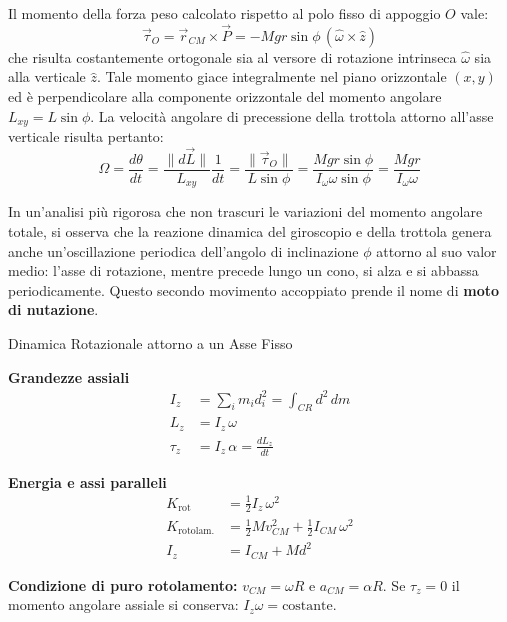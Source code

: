 Il momento della forza peso calcolato rispetto al polo fisso di appoggio $O$ vale:
\begin{equation}
    \vec{\tau}_O = \vec{r}_{CM} \times \vec{P} = -Mgr \sin\phi \, (\hat{\omega} \times \hat{z})
\end{equation}
che risulta costantemente ortogonale sia al versore di rotazione intrinseca $\hat{\omega}$ sia alla verticale $\hat{z}$. Tale momento giace integralmente nel piano orizzontale $(x,y)$ ed è perpendicolare alla componente orizzontale del momento angolare $L_{xy} = L \sin\phi$.
La velocità angolare di precessione della trottola attorno all'asse verticale risulta pertanto:
\begin{equation}
    \Omega = \frac{d\theta}{dt} = \frac{\|d\vec{L}\|}{L_{xy}} \frac{1}{dt} = \frac{\|\vec{\tau}_O\|}{L \sin\phi} = \frac{Mgr \sin\phi}{I_\omega \omega \sin\phi} = \frac{Mgr}{I_\omega \omega}
\end{equation}

In un'analisi più rigorosa che non trascuri le variazioni del momento angolare totale, si osserva che la reazione dinamica del giroscopio e della trottola genera anche un'oscillazione periodica dell'angolo di inclinazione $\phi$ attorno al suo valor medio: l'asse di rotazione, mentre precede lungo un cono, si alza e si abbassa periodicamente. Questo secondo movimento accoppiato prende il nome di \textbf{moto di nutazione}.

\begin{formulario}{Dinamica Rotazionale attorno a un Asse Fisso}
\begin{minipage}[t]{0.48\textwidth}
\textbf{Grandezze assiali}
\begin{align*}
    I_z &= \sum_i m_i d_i^2 = \int_{CR} d^2 \, dm \\
    L_z &= I_z \, \omega \\
    \tau_z &= I_z \, \alpha = \frac{dL_z}{dt}
\end{align*}
\end{minipage}
\hfill
\begin{minipage}[t]{0.48\textwidth}
\textbf{Energia e assi paralleli}
\begin{align*}
    K_{\text{rot}} &= \tfrac{1}{2} I_z \, \omega^2 \\
    K_{\text{rotolam.}} &= \tfrac{1}{2} M v_{CM}^2 + \tfrac{1}{2} I_{CM}\, \omega^2 \\
    I_z &= I_{CM} + M d^2
\end{align*}
\end{minipage}
\vspace{2pt}

\textbf{Condizione di puro rotolamento:} $v_{CM} = \omega R$ \; e \; $a_{CM} = \alpha R$.
Se $\tau_z = 0$ il momento angolare assiale si conserva: $I_z \omega = \text{costante}$.
\end{formulario}

